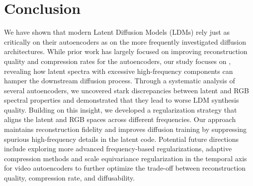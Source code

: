 \section{Conclusion}
\label{sec:conclusion}


We have shown that modern Latent Diffusion Models (LDMs) rely just as critically on their autoencoders as on the more frequently investigated diffusion architectures.
While prior work has largely focused on improving reconstruction quality and compression rates for the autoencoders, our study focuses on \diffusability, revealing how latent spectra with excessive high-frequency components can hamper the downstream diffusion process.
Through a systematic analysis of several autoencoders, we uncovered stark discrepancies between latent and RGB spectral properties and demonstrated that they lead to worse LDM synthesis quality.
Building on this insight, we developed a regularization strategy that aligns the latent and RGB spaces across different frequencies.
Our approach maintains reconstruction fidelity and improves diffusion training by suppressing spurious high-frequency details in the latent code.
Potential future directions include exploring more advanced frequency-based regularizations, adaptive compression methods and scale equivariance regularization in the temporal axis for video autoencoders to further optimize the trade-off between reconstruction quality, compression rate, and diffusability.

